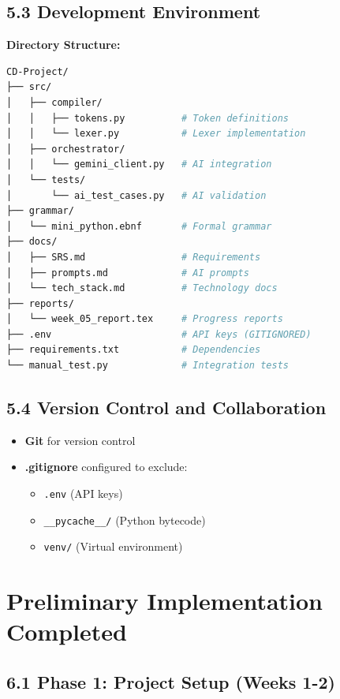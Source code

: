 \documentclass[a4paper,11pt]{article}
\begin{document}
\subsection{5.3 Development Environment}

\textbf{Directory Structure:}
\begin{lstlisting}[language=bash]
CD-Project/
├── src/
│   ├── compiler/
│   │   ├── tokens.py          # Token definitions
│   │   └── lexer.py           # Lexer implementation
│   ├── orchestrator/
│   │   └── gemini_client.py   # AI integration
│   └── tests/
│       └── ai_test_cases.py   # AI validation
├── grammar/
│   └── mini_python.ebnf       # Formal grammar
├── docs/
│   ├── SRS.md                 # Requirements
│   ├── prompts.md             # AI prompts
│   └── tech_stack.md          # Technology docs
├── reports/
│   └── week_05_report.tex     # Progress reports
├── .env                       # API keys (GITIGNORED)
├── requirements.txt           # Dependencies
└── manual_test.py             # Integration tests
\end{lstlisting}

\subsection{5.4 Version Control and Collaboration}

\begin{itemize}[leftmargin=*]
    \item \textbf{Git} for version control
    \item \textbf{.gitignore} configured to exclude:
    \begin{itemize}
        \item \texttt{.env} (API keys)
        \item \texttt{\_\_pycache\_\_/} (Python bytecode)
        \item \texttt{venv/} (Virtual environment)
    \end{itemize}
\end{itemize}

\clearpage

\section{Preliminary Implementation Completed}

\subsection{6.1 Phase 1: Project Setup (Weeks 1-2)}
\end{document}
